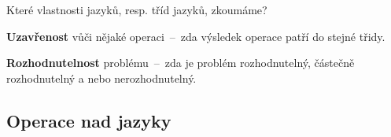 \begin{compactitem}
    \item Které vlastnosti jazyků, resp. tříd jazyků, zkoumáme? \begin{compactitem}
        \item \textbf{Uzavřenost} vůči nějaké operaci~--~zda výsledek operace patří do stejné třidy.

        \item \textbf{Rozhodnutelnost} problému~--~zda je problém rozhodnutelný, částečně rozhodnutelný a nebo nerozhodnutelný.
    \end{compactitem}
\end{compactitem}

\subsection*{Operace nad jazyky}

